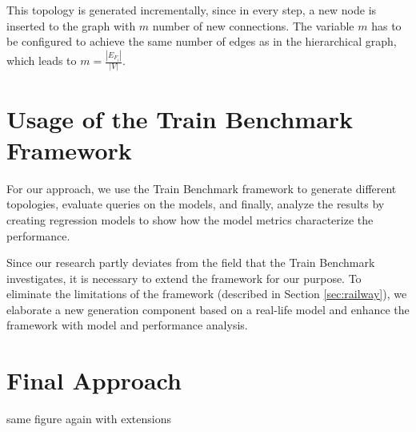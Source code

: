 This topology is generated incrementally, since in every step, a new node is inserted to the graph with $m$ number of new connections. The variable $m$ has to be configured to achieve the same number of edges as in the hierarchical graph, which leads to $m = \frac{|E_{F_i}|}{|V|}$.

\section{Usage of the Train Benchmark Framework}

For our approach, we use the Train Benchmark framework to generate different topologies, evaluate queries on the models, and finally, analyze the results by creating regression models to show how the model metrics characterize the performance.

Since our research partly deviates from the field that the Train Benchmark investigates, it is necessary to extend the framework for our purpose. To eliminate the limitations of the framework (described in Section \ref{sec:railway}), we elaborate a new generation component based on a real-life model and enhance the framework with model and performance analysis.

\section{Final Approach}

same figure again with extensions
